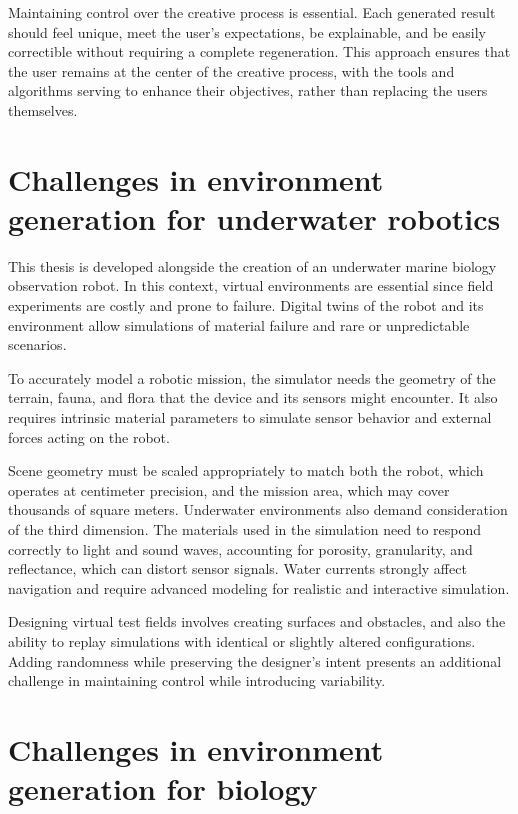 Maintaining control over the creative process is essential. Each generated result should feel unique, meet the user's expectations, be explainable, and be easily correctible without requiring a complete regeneration. This approach ensures that the user remains at the center of the creative process, with the tools and algorithms serving to enhance their objectives, rather than replacing the users themselves.



\section{Challenges in environment generation for underwater robotics}

This thesis is developed alongside the creation of an underwater marine biology observation robot. In this context, virtual environments are essential since field experiments are costly and prone to failure. Digital twins of the robot and its environment allow simulations of material failure and rare or unpredictable scenarios.

To accurately model a robotic mission, the simulator needs the geometry of the terrain, fauna, and flora that the device and its sensors might encounter. It also requires intrinsic material parameters to simulate sensor behavior and external forces acting on the robot.

Scene geometry must be scaled appropriately to match both the robot, which operates at centimeter precision, and the mission area, which may cover thousands of square meters. Underwater environments also demand consideration of the third dimension. The materials used in the simulation need to respond correctly to light and sound waves, accounting for porosity, granularity, and reflectance, which can distort sensor signals. Water currents strongly affect navigation and require advanced modeling for realistic and interactive simulation.

Designing virtual test fields involves creating surfaces and obstacles, and also the ability to replay simulations with identical or slightly altered configurations. Adding randomness while preserving the designer’s intent presents an additional challenge in maintaining control while introducing variability.


\section{Challenges in environment generation for biology}

